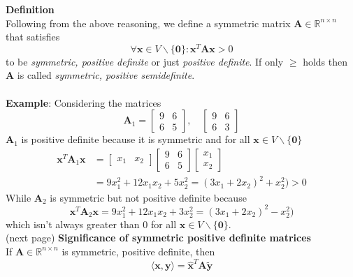 \documentclass{report}
\begin{document}
\textbf{Definition}\\
Following from the above reasoning, we define a symmetric matrix $\bm{A}\in\mathbb{R}^{n\times n}$ that
satisfies
\begin{equation*}
\forall\bm{x}\in V\backslash\{\bm{0}\}:\bm{x}^T\bm{Ax}>0
\end{equation*}
to be \textit{symmetric, positive definite} or just \textit{positive definite}. If only $\geq$ holds 
then $\bm{A}$ is called \textit{symmetric, positive semidefinite}.\\
\vspace{1mm}\\
\textbf{Example}: Considering the matrices
\begin{equation*}
\bm{A}_1=\begin{bmatrix}
9&6\\6&5
\end{bmatrix},\quad\begin{bmatrix}
9&6\\6&3
\end{bmatrix}
\end{equation*}
$\bm{A}_1$ is positive definite because it is symmetric and for all $\bm{x}\in V\backslash\{\bm{0}\}$
\begin{align*}
\bm{x}^T\bm{A}_1\bm{x}&=\begin{bmatrix}x_1&x_2\end{bmatrix}\begin{bmatrix}9&6\\6&5\end{bmatrix}
\begin{bmatrix}x_1\\x_2\end{bmatrix}\\
&=9x_1^2+12x_1x_2+5x_2^2=(3x_1+2x_2)^2+x_2^2)>0
\end{align*}
While $\bm{A}_2$ is symmetric but not positive definite because
\begin{equation*}
\bm{x}^T\bm{A}_2\bm{x}
=9x_1^2+12x_1x_2+3x_2^2=(3x_1+2x_2)^2-x_2^2)
\end{equation*}
which isn't always greater than 0 for all $\bm{x}\in V\backslash\{\bm{0}\}$.\\
(next page)
\newpage
\noindent\textbf{Significance of symmetric positive definite matrices}\\
If $\bm{A}\in\mathbb{R}^{n\times n}$ is symmetric, positive definite, then
\begin{equation*}
\langle\bm{x},\bm{y}\rangle=\hat{\bm{x}}^T\bm{A}\tilde{\bm{y}}
\end{equation*}
\end{document}
